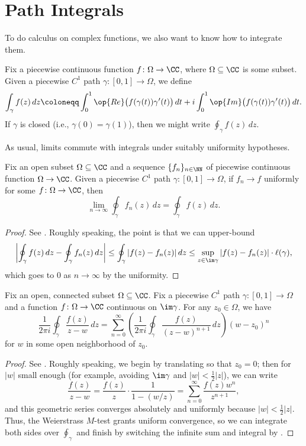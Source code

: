 \documentclass[notes.tex]{subfiles}
\begin{document}
\section{Path Integrals}
To do calculus on complex functions, we also want to know how to integrate them.
\begin{definition}
	Fix a piecewise continuous function $f\colon\Omega\to\CC$, where $\Omega\subseteq\CC$ is some subset. Given a piecewise $C^1$ path $\gamma\colon[0,1]\to\Omega$, we define
	\[\int_\gamma f(z)\,dz\coloneqq\int_0^1\op{Re}\big(f(\gamma(t))\gamma'(t)\big)\,dt+i\int_0^1\op{Im}\big(f(\gamma(t))\gamma'(t)\big)\,dt.\]
	If $\gamma$ is closed (i.e., $\gamma(0)=\gamma(1)$), then we might write $\oint_\gamma f(z)\,dz$.
\end{definition}
As usual, limits commute with integrals under suitably uniformity hypotheses.
\begin{lemma} \label{lem:swap-int-limit}
	Fix an open subset $\Omega\subseteq\CC$ and a sequence $\{f_n\}_{n\in\NN}$ of piecewise continuous function $\Omega\to\CC$. Given a piecewise $C^1$ path $\gamma\colon[0,1]\to\Omega$, if $f_n\to f$ uniformly for some $f\colon\Omega\to\CC$, then
	\[\lim_{n\to\infty}\oint_\gamma f_n(z)\,dz=\oint_\gamma f(z)\,dz.\]
\end{lemma}
\begin{proof}
	See \cite[Lemma~4.62]{nir-complex-analysis}. Roughly speaking, the point is that we can upper-bound
	\[\left|\oint_\gamma f(z)\,dz-\oint_\gamma f_n(z)\,dz\right|\le\oint_\gamma|f(z)-f_n(z)|\,dz\le\sup_{z\in\im\gamma}|f(z)-f_n(z)|\cdot\ell(\gamma),\]
	which goes to $0$ as $n\to\infty$ by the uniformity.
\end{proof}
\begin{proposition} \label{prop:get-power-series}
	Fix an open, connected subset $\Omega\subseteq\CC$. Fix a piecewise $C^1$ path $\gamma\colon[0,1]\to\Omega$ and a function $f\colon\Omega\to\CC$ continuous on $\im\gamma$. For any $z_0\in\Omega$, we have
	\[\frac1{2\pi i}\oint_\gamma\frac{f(z)}{z-w}\,dz=\sum_{n=0}^\infty\left(\frac1{2\pi i}\oint_\gamma\frac{f(z)}{(z-w)^{n+1}}\,dz\right)(w-z_0)^n\]
	for $w$ in some open neighborhood of $z_0$.
\end{proposition}
\begin{proof}
	See \cite[Proposition~4.61]{nir-complex-analysis}. Roughly speaking, we begin by translating so that $z_0=0$; then for $|w|$ small enough (for example, avoiding $\im\gamma$ and $|w|<\frac12|z|$), we can write
	\[\frac{f(z)}{z-w}=\frac{f(z)}z\cdot\frac1{1-(w/z)}=\sum_{n=0}^\infty\frac{f(z)w^n}{z^{n+1}},\]
	and this geometric series converges absolutely and uniformly because $|w|<\frac12|z|$. Thus, the Weierstrass $M$-test grants uniform convergence, so we can integrate both sides over $\oint_\gamma$ and finish by switching the infinite sum and integral by .
\end{proof}
\end{document}
